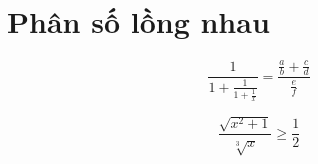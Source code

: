 \documentclass[12pt,a4paper]{article}
\begin{document}
\section*{Phân số lồng nhau}
\[ \frac{1}{1+\frac{1}{1+\frac{1}{x}}}=\frac{\frac{a}{b}+\frac{c}{d}}{\frac{e}{f}} \]

\[ \dfrac{\sqrt{x^{2}+1}}{\sqrt[3]{x}}\ge\frac{1}{2} \]
\end{document}

